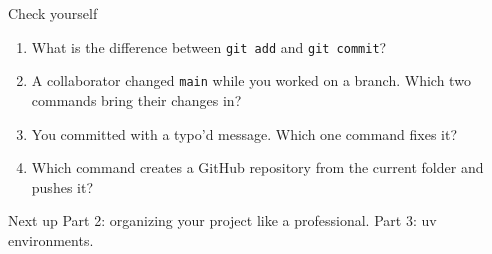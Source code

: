 \documentclass[aspectratio=169]{beamer}
\begin{document}
\begin{frame}{Check yourself}
  \begin{enumerate}
    \item What is the difference between \texttt{git add} and \texttt{git commit}?
    \item A collaborator changed \texttt{main} while you worked on a branch.
          Which two commands bring their changes in?
    \item You committed with a typo'd message. Which one command fixes it?
    \item Which command creates a GitHub repository from the current folder
          and pushes it?
  \end{enumerate}
  \vspace{0.4cm}
  \begin{block}{Next up}
    Part 2: organizing your project like a professional. \quad
    Part 3: uv environments.
  \end{block}
\end{frame}
\end{document}
